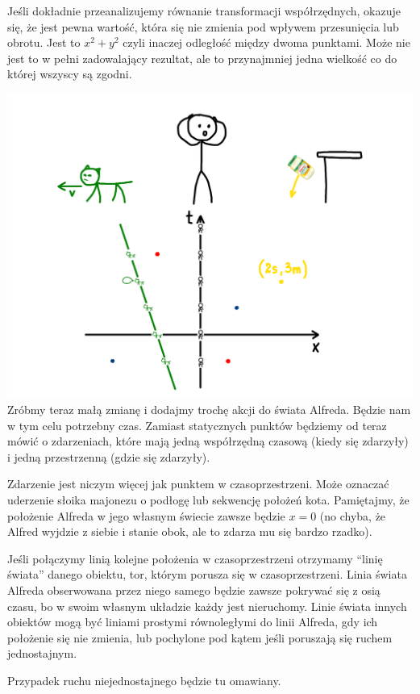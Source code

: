 \documentclass[10pt,twocolumn,fleqn,polish]{article}
\begin{document}
Jeśli dokładnie przeanalizujemy równanie transformacji współrzędnych,
okazuje się, że jest pewna wartość, która się nie zmienia pod wpływem
przesunięcia lub obrotu. Jest to $x^2 + y^2$ czyli inaczej
odległość między dwoma punktami.
Może nie jest to w pełni zadowalający rezultat, ale to przynajmniej
jedna wielkość co do której wszyscy są zgodni.
\newpage

\noindent\includegraphics[width=1\linewidth]{pages/STA-page4}
Zróbmy teraz małą zmianę i dodajmy trochę akcji do świata Alfreda. Będzie
nam w tym celu potrzebny czas. Zamiast statycznych punktów będziemy od
teraz mówić o zdarzeniach, które mają jedną współrzędną czasową (kiedy się zdarzyły)
i jedną przestrzenną (gdzie się zdarzyły).

Zdarzenie jest niczym więcej jak punktem w czasoprzestrzeni.
Może oznaczać uderzenie słoika majonezu o podłogę lub sekwencję położeń kota.
Pamiętajmy, że położenie Alfreda w jego własnym
świecie zawsze będzie $x=0$ (no chyba, że Alfred wyjdzie z siebie i stanie obok,
ale to zdarza mu się bardzo rzadko).

Jeśli połączymy linią kolejne położenia w czasoprzestrzeni
otrzymamy ``linię świata''  danego obiektu, tor, którym porusza się w czasoprzestrzeni.
Linia świata Alfreda obserwowana przez niego samego będzie zawsze pokrywać się z osią czasu, bo
w swoim własnym układzie każdy jest nieruchomy.
Linie świata innych obiektów mogą być liniami prostymi równoległymi
do linii Alfreda, gdy ich położenie się nie zmienia, lub pochylone
pod kątem jeśli poruszają się ruchem jednostajnym.

Przypadek ruchu niejednostajnego będzie tu omawiany.
\newpage
\end{document}
